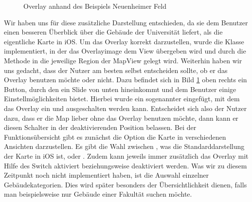 \documentclass{report}
\begin{document}
\begin{figure}[ht]\label{bild_4}
\centering {}
\caption{Overlay anhand des Beispiels Neuenheimer Feld}
\end{figure}

Wir haben uns für diese zusätzliche Darstellung entschieden, da sie dem Benutzer einen besseren Überblick über die Gebäude der Universität liefert, als die eigentliche Karte in iOS. Um das Overlay korrekt darzustellen, wurde die Klasse  implementiert, in der das Overlayimage dem View übergeben wird und durch die Methode  in die jeweilige Region der MapView gelegt wird. Weiterhin haben wir uns gedacht, dass der Nutzer am besten selbst entscheiden sollte, ob er das Overlay benutzen möchte oder nicht. Dazu befindet sich in Bild \ref{bild_4} oben rechts ein Button, durch den ein Slide von unten hineinkommt und dem Benutzer einige Einstellmöglichkeiten bietet. Hierbei wurde ein sogenannter  eingefügt, mit dem das Overlay ein und ausgeschalten werden kann. Entscheidet sich also der Nutzer dazu, dass er die Map lieber ohne das Overlay benutzen möchte, dann kann er diesen Schalter in der deaktivierenden Position belassen. Bei der Funktionsübersicht gibt es zunächst die Option die Karte in verschiedenen Ansichten darzustellen. Es gibt die Wahl zwischen , was die Standarddarstellung der Karte in iOS ist,  oder . Zudem kann jeweils immer zusätzlich das Overlay mit Hilfe des Switch aktiviert beziehungsweise deaktiviert werden. Was wir zu diesem Zeitpunkt noch nicht implementiert haben, ist die Auswahl einzelner Gebäudekategorien. Dies wird später besonders der Übersichtlichkeit dienen, falls man beispielsweise nur Gebäude einer Fakultät suchen möchte.
\end{document}
